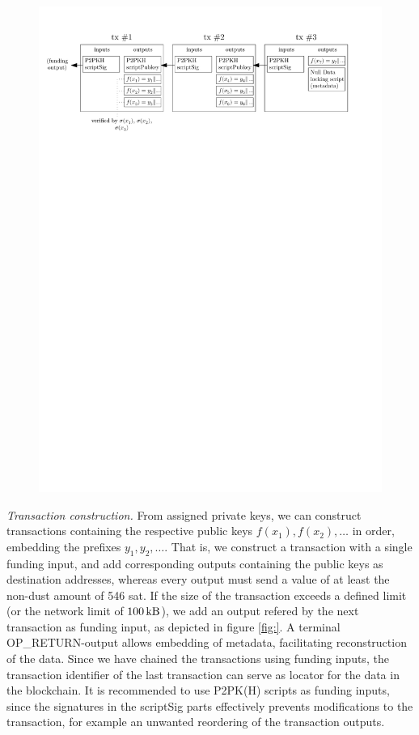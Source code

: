\documentclass[10pt,a4paper,twocolumn]{article}
\begin{document}
\begin{figure}
    \centering
    \includegraphics[width=16cm,keepaspectratio]{figure.pdf}
    \caption{}
\end{figure}

\emph{Transaction construction.}
From assigned private keys, we can construct transactions containing the respective public keys $f(x_1), f(x_2), \dots$ in order, embedding the prefixes $y_1, y_2, \dots$.
That is, we construct a transaction with a single funding input, and add corresponding outputs containing the public keys as destination addresses, whereas every output must send a value of at least the non-dust amount of 546 sat.
If the size of the transaction exceeds a defined limit (or the network limit of $\SI{100}{\kilo\byte}$), we add an output refered by the next transaction as funding input, as depicted in figure \ref{fig:}.
A terminal OP\_RETURN-output allows embedding of metadata, facilitating reconstruction of the data.
Since we have chained the transactions using funding inputs, the transaction identifier of the last transaction can serve as locator for the data in the blockchain.
It is recommended to use P2PK(H) scripts as funding inputs, since the signatures in the scriptSig parts effectively prevents modifications to the transaction, for example an unwanted reordering of the transaction outputs.
\end{document}
